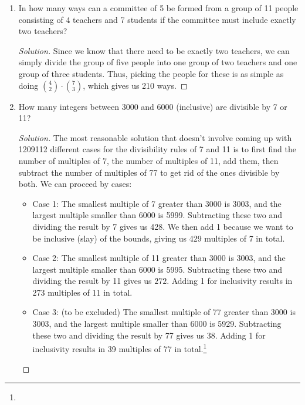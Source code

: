 \documentclass{article}
\newenvironment{solution}
  {\renewcommand\qedsymbol{$\blacksquare$}\begin{proof}[Solution]}
  {\end{proof}}
\begin{document}
\begin{enumerate}
\begin{minipage}[t]{.14\textwidth}
    \end{minipage}%
    \item In how many ways can a committee of 5 be formed from a group of 11 people consisting of 4 teachers and 7 students if the committee must include exactly two teachers?\begin{solution}
        Since we know that there need to be exactly two teachers, we can simply divide the group of five people into one group of two teachers and one group of three students. Thus, picking the people 
        for these is as simple as doing $\binom{4}{2} \cdot \binom{7}{3}$, which gives us 210 ways. 
    \end{solution} 
    \item How many integers between 3000 and 6000 (inclusive) are divisible by 7 or 11?\begin{solution} 
        The most reasonable solution that doesn't involve coming up with 1209112 different cases for the divisibility rules of 7 and 11 is to first find the number of multiples of 7, the number of multiples of 11, add them, then subtract the number 
        of multiples of 77 to get rid of the ones divisible by both. We can proceed by cases:\begin{itemize} 
            \item Case 1: The smallest multiple of 7 greater than 3000 is 3003, and the largest multiple smaller than 6000 is 5999. Subtracting these two and dividing the result by 7 gives us 428. We then add 1 because we want to be inclusive (slay) of the bounds,
            giving us 429 multiples of 7 in total.
            \item Case 2: The smallest multiple of 11 greater than 3000 is 3003, and the largest multiple smaller than 6000 is 5995. Subtracting these two and dividing the result by 11 gives us $272$. Adding 1 for inclusivity results in 273 multiples of 11 in total. 
            \item Case 3: (to be excluded) The smallest multiple of 77 greater than 3000 is 3003, and the largest multiple smaller than 6000 is 5929. Subtracting these two and dividing the result by 77 gives us 38. Adding 1 for inclusivity results in 39 multiples of 77 in total.\footnote{
}
\end{itemize}
\end{solution}
\end{enumerate}
\end{document}
